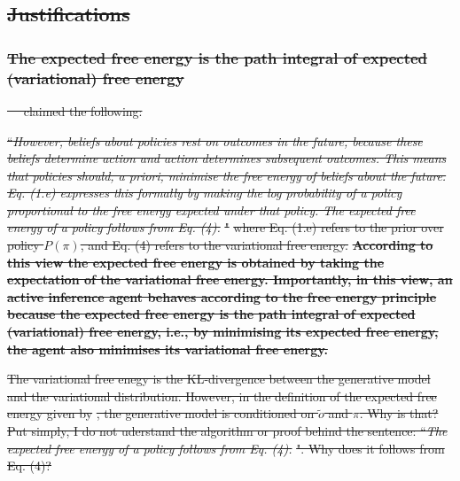 \documentclass[twoside,11pt]{article}
\providecommand{\DIFdel}[1]{{\protect\color{red}\sout{#1}}}                      %
\begin{document}
\subsection{\DIFdel{Justifications}}
\addtocounter{subsection}{-1}%

\subsubsection{\DIFdel{The expected free energy is the path integral of expected (variational) free energy}}
\addtocounter{subsubsection}{-1}%

\DIFdel{\mbox{%
\citet{FRISTON2016862} }\hspace{0pt}%
claimed the following:
}%

\DIFdel{``}\textit{\DIFdel{However, beliefs about policies rest on outcomes in the future, because these beliefs determine action and action determines subsequent outcomes. This means that policies should, a priori, minimise the free energy of beliefs about the future. Eq. (1.e) expresses this formally by making the log probability of a policy proportional to the free energy expected under that policy. The expected free energy of a policy follows from Eq. (4).}}%
\DIFdel{"
}%
\DIFdel{where Eq. (1.e) refers to the prior over policy $P(\pi)$, and Eq. (4) refers to the variational free energy. }\textbf{\DIFdel{According to this view the expected free energy is obtained by taking the expectation of the variational free energy. Importantly, in this view, an active inference agent behaves according to the free energy principle because the expected free energy is the path integral of expected (variational) free energy, i.e., by minimising its expected free energy, the agent also minimises its variational free energy.}}

\DIFdel{The variational free enegy is the KL-divergence between the generative model and the variational distribution. However, in the definition of the expected free energy given by }%
\DIFdel{, the generative model is conditioned on $\tilde{o}$ and $\pi$. Why is that? Put simply, I do not uderstand the algorithm or proof behind the sentence: ``}\textit{\DIFdel{The expected free energy of a policy follows from Eq. (4).}}%
\DIFdel{". Why does it follows from Eq. (4)?
}%
\end{document}
